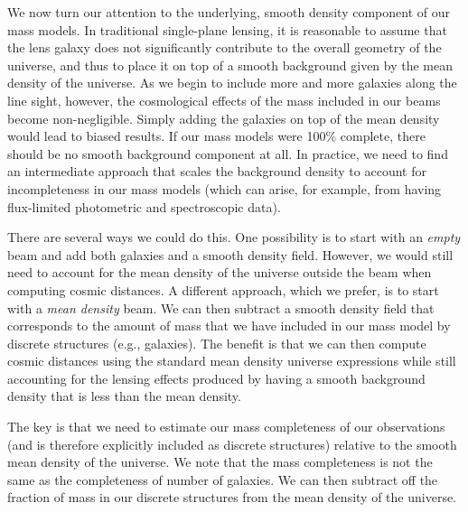 \documentclass{emulateapj}
\begin{document}
We now turn our attention to the underlying, smooth density component of our mass models. In traditional single-plane lensing, it is reasonable to assume that the lens galaxy does not significantly contribute to the overall geometry of the universe, and thus to place it on top of a smooth background given by the mean density of the universe.  As we begin to include more and more galaxies along the line sight, however, the cosmological effects of the mass included in our beams become non-negligible. Simply adding the galaxies on top of the mean density would lead to biased results. If our mass models were 100\% complete, there should be no smooth background component at all.  In practice, we need to find an intermediate approach that scales the background density to account for incompleteness in our mass models (which can arise, for example, from having flux-limited photometric and spectroscopic data).

There are several ways we could do this. One possibility is to start with an \emph{empty} beam and add both galaxies and a smooth density field.  However, we would still need to account for the mean density of the universe outside the beam when computing cosmic distances.  A different approach, which we prefer, is to start with a \emph{mean density} beam. We can then subtract a smooth density field that corresponds to the amount of mass that we have included in our mass model by discrete structures (e.g., galaxies). The benefit is that we can then compute cosmic distances using the standard mean density universe expressions while still accounting for the lensing effects produced by having a smooth background density that is less than the mean density.

The key is that we need to estimate our mass completeness of our observations (and is therefore explicitly included as discrete structures) relative to the smooth mean density of the universe. We note that the mass completeness is not the same as the completeness of number of galaxies. We can then subtract off the fraction of mass in our discrete structures from the mean density of the universe.
\end{document}
